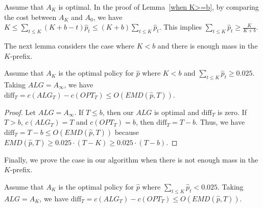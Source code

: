 \begin{observation}
    \label{K prefix needs significant mass}
    Assume that $A_K$ is optimal. In the proof of Lemma~\ref{when K>=b}, by comparing the cost between $A_K$ and $A_0$, we have $K \leq \sum_{t \leq K} (K+b-t) \hat{p}_t \leq (K+b)\sum_{t \leq K} \hat{p}_t$. This implies $\sum_{t \leq K} \hat{p}_t \geq \frac{K}{K+b}$.
\end{observation}

The next lemma considers the case where $K<b$ and there is enough mass in the $K$-prefix.

\begin{lemma}
    \label{K<b and K prefix constant mass}
    Assume that $A_K$ is the optimal policy for $\hat{p}$ where $K<b$ and $\sum_{t \leq K} \hat{p}_t \geq 0.025$. Taking $ALG=A_\infty$, we have $\text{diff}_T = c(ALG_T)-c(OPT_T) \leq O(EMD(\hat{p},T))$.
\end{lemma}

\begin{proof}
    Let $ALG=A_\infty$. If $T \leq b$, then our $ALG$ is optimal and $\text{diff}_T$ is zero. If $T>b$, $c(ALG_T)=T$ and $c(OPT_T)=b$, then $\text{diff}_T = T-b$. Thus, we have $\text{diff}_T = T-b \leq O(EMD(\hat{p},T))$ because $EMD(\hat{p},T) \geq 0.025\cdot(T-K)\geq 0.025 \cdot (T-b)$.
\end{proof}

Finally, we prove the case in our algorithm when there is not enough mass in the $K$-prefix.

\begin{lemma}
    \label{K prefix subconstant mass}
    Assume that $A_K$ is the optimal policy for $\hat{p}$ where $\sum_{t \leq K} \hat{p}_t < 0.025$. Taking $ALG=A_K$, we have $\text{diff}_T = c(ALG_T)-c(OPT_T) \leq O(EMD(\hat{p},T))$.
\end{lemma}

